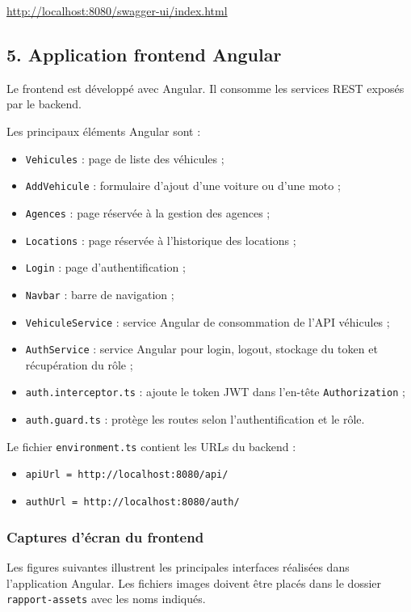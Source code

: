 \documentclass[12pt,a4paper]{article}
\newcommand{\code}[1]{\texttt{#1}}
\newcommand{\question}[1]{\subsection*{#1}}
\begin{document}
\begin{center}
    \url{http://localhost:8080/swagger-ui/index.html}
\end{center}

\question{5. Application frontend Angular}

Le frontend est développé avec Angular.
Il consomme les services REST exposés par le backend.

Les principaux éléments Angular sont :

\begin{itemize}
    \item \code{Vehicules} : page de liste des véhicules ;
    \item \code{AddVehicule} : formulaire d'ajout d'une voiture ou d'une moto ;
    \item \code{Agences} : page réservée à la gestion des agences ;
    \item \code{Locations} : page réservée à l'historique des locations ;
    \item \code{Login} : page d'authentification ;
    \item \code{Navbar} : barre de navigation ;
    \item \code{VehiculeService} : service Angular de consommation de l'API véhicules ;
    \item \code{AuthService} : service Angular pour login, logout, stockage du token et récupération du rôle ;
    \item \code{auth.interceptor.ts} : ajoute le token JWT dans l'en-tête \code{Authorization} ;
    \item \code{auth.guard.ts} : protège les routes selon l'authentification et le rôle.
\end{itemize}

Le fichier \code{environment.ts} contient les URLs du backend :

\begin{itemize}
    \item \code{apiUrl = http://localhost:8080/api/}
    \item \code{authUrl = http://localhost:8080/auth/}
\end{itemize}

\subsubsection*{Captures d'écran du frontend}

Les figures suivantes illustrent les principales interfaces réalisées dans l'application Angular.
Les fichiers images doivent être placés dans le dossier \code{rapport-assets} avec les noms indiqués.
\end{document}
